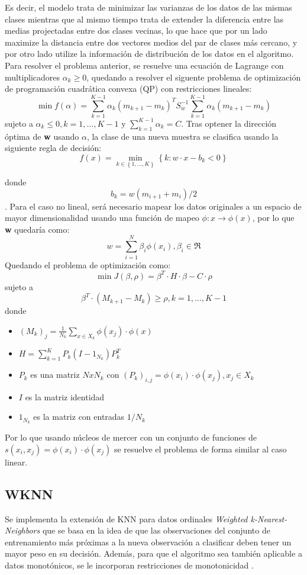 	Es decir, el modelo trata de minimizar las varianzas de los datos de las mismas clases mientras que al mismo tiempo trata de extender la diferencia entre las medias projectadas entre dos clases vecinas, lo que hace que por un lado maximize la distancia entre dos vectores medios del par de clases más cercano, y por otro lado utilize la información de distribución de los datos en el algoritmo. \newline
	Para resolver el problema anterior, se resuelve una ecuación de Lagrange con multiplicadores $\alpha_k \geq 0$, quedando a resolver el siguente problema de optimización de programación cuadrática convexa (QP) con restricciones lineales:
	$$\min f(\alpha)=\sum_{k=1}^{K-1} \alpha_k(m_{k+1}-m_k)^T S_w^{-1} \sum_{k=1}^{K-1} \alpha_k (m_{k+1}-m_k)$$
	sujeto a $ \alpha_{k} \leq 0, k=1,...,K-1$ y $\sum_{k=1}^{K-1}\alpha_{k}=C$.
	Tras optener la dirección óptima de \textbf{w} usando $\alpha$, la clase de una nueva muestra se clasifica usando la siguiente regla de decisión:
	$$f(x)=\min_{k \in \left\{ 1,...,K \right\}} \left\{ k:w \cdot x - b_k < 0  \right\}$$
	
	donde $$b_k=w(m_{i+1}+m_i)/2$$.
	Para el caso no lineal, será necesario mapear los datos originales a un espacio de mayor dimensionalidad usando una función de mapeo $ \phi : x \rightarrow \phi(x)$, por lo que \textbf{w} quedaría como:
	$$w=\sum_{i=1}^{N} \beta_i \phi(x_i), \beta_i \in \Re$$
	Quedando el problema de optimización como:
	$$\min J(\beta,\rho)=\beta^T \cdot H \cdot \beta - C \cdot  \rho$$
	sujeto a $$ \beta^T \cdot (M_{k+1}-M_k) \geq \rho, k=1,...,K-1$$
	donde
	\begin{itemize}
		\item $(M_k)_j= \frac{1}{N_k} \sum_{x \in X_k} \phi(x_j) \cdot \phi(x)$
		\item $H=\sum_{k=1}^{K}P_k(I-1_{N_k})P_k^T$
		\item $P_k$ es una matriz $N x N_k$ con $(P_k)_{i,j}=\phi(x_i) \cdot \phi(x_j), x_j \in X_k$
		\item $I$ es la matriz identidad
		\item $1_{N_k}$ es la matriz con entradas $1/N_k$ 
	\end{itemize}
	Por lo que usando núcleos de mercer con un conjunto de funciones de $s(x_i,x_j)=\phi(x_i) \cdot \phi(x_j)$ se resuelve el problema de forma similar al caso linear.
\subsection{WKNN}
Se implementa la extensión de KNN para datos ordinales 
\textit{Weighted k-Nearest-Neighbors} \cite{hechenbichler2004weighted} que se basa en la idea de que las observaciones del conjunto de entrenamiento más próximas a la nueva observación a clasificar deben tener un mayor peso en su decisión. Además, para que el algoritmo sea también aplicable a datos monotónicos, se le incorporan restricciones de monotonicidad \cite{duivesteijn2008nearest}.

